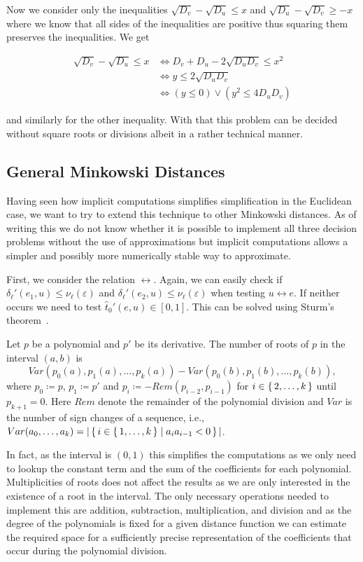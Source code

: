 Now we consider only the inequalities \(\sqrt{D_v} - \sqrt{D_u} \leq x\) and \(\sqrt{D_u} - \sqrt{D_v} \geq -x\) where we know that all sides of the inequalities are positive thus squaring them preserves the inequalities. We get 

\begin{align*}
  \sqrt{D_v} - \sqrt{D_u} \leq x &\iff D_v + D_u - 2\sqrt{D_uD_v} \leq x^2 \\
   &\iff y \leq 2\sqrt{D_uD_v} \\
   &\iff (y \leq 0) \lor (y^2 \leq 4D_uD_v)
\end{align*}

and similarly for the other inequality. With that this problem can be decided without square roots or divisions albeit in a rather technical manner.

\subsection{General Minkowski Distances}
Having seen how implicit computations simplifies simplification in the Euclidean case, we want to try to extend this technique to other Minkowski distances. As of writing this we do not know whether it is possible to implement all three decision problems without the use of approximations but implicit computations allows a simpler and possibly more numerically stable way to approximate. 

First, we consider the relation \(\leftrightarrow\). Again, we can easily check if \(\delta_\ell'(e_1, u) \leq \nu_\ell(\varepsilon)\) and \(\delta_\ell'(e_2, u) \leq \nu_\ell(\varepsilon)\) when testing \(u \leftrightarrow e\). If neither occurs we need to test \(\hat t_0'(e, u) \in [0,1]\). This can be solved using Sturm's theorem~\cite{algorithms_in_real_algebraic_geometry}. 
\begin{theorem}
  Let \(p\) be a polynomial and \(p'\) be its derivative. The number of roots of \(p\) in the interval \((a,b)\) is 
  \[Var(p_0(a), p_1(a), \dots, p_k(a)) - Var(p_0(b), p_1(b), \dots, p_k(b)),\]
  where \(p_0 \coloneq p\), \(p_1 \coloneq p'\) and \(p_i \coloneq -Rem(p_{i-2}, p_{i-1})\) for \(i \in \set{2, \dots, k}\) until \(p_{k+1} = 0\). 
  Here \(Rem\) denote the remainder of the polynomial division and \(Var\) is the number of sign changes of a sequence, i.e., \(Var(a_0,\dots, a_k) = |\set{i \in \set{1, \dots, k} \mid a_ia_{i-1} < 0}|\).
\end{theorem}

In fact, as the interval is \((0, 1)\) this simplifies the computations as we only need to lookup the constant term and the sum of the coefficients for each polynomial. 
Multiplicities of roots does not affect the results as we are only interested in the existence of a root in the interval. 
The only necessary operations needed to implement this are addition, subtraction, multiplication, and division and as the degree of the polynomials is fixed for a given distance function we can estimate the required space for a sufficiently precise representation of the coefficients that occur during the polynomial division. 


